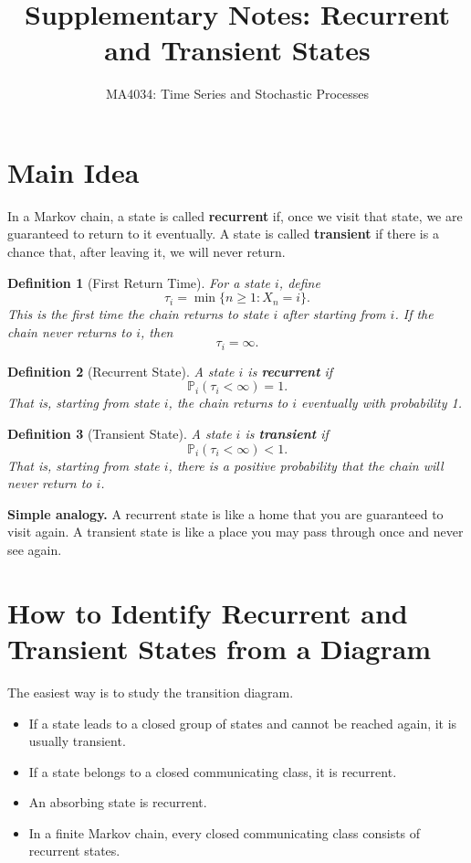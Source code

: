 \documentclass[12pt,a4paper]{article}
\title{\textbf{Supplementary Notes: Recurrent and Transient States}}
\author{MA4034: Time Series and Stochastic Processes}
\date{}
\theoremstyle{notestyle}
\newtheorem{definition}{Definition}
\newcommand{\Prob}{\mathbb{P}}
\begin{document}
\maketitle

\section{Main Idea}

In a Markov chain, a state is called \textbf{recurrent} if, once we visit that state, we are guaranteed to return to it eventually. A state is called \textbf{transient} if there is a chance that, after leaving it, we will never return.

\begin{definition}[First Return Time]
For a state $i$, define
\[
\tau_i=\min\{n\geq 1:X_n=i\}.
\]
This is the first time the chain returns to state $i$ after starting from $i$. If the chain never returns to $i$, then
\[
\tau_i=\infty.
\]
\end{definition}

\begin{definition}[Recurrent State]
A state $i$ is \textbf{recurrent} if
\[
\Prob_i(\tau_i<\infty)=1.
\]
That is, starting from state $i$, the chain returns to $i$ eventually with probability 1.
\end{definition}

\begin{definition}[Transient State]
A state $i$ is \textbf{transient} if
\[
\Prob_i(\tau_i<\infty)<1.
\]
That is, starting from state $i$, there is a positive probability that the chain will never return to $i$.
\end{definition}

\textbf{Simple analogy.} A recurrent state is like a home that you are guaranteed to visit again. A transient state is like a place you may pass through once and never see again.

\section{How to Identify Recurrent and Transient States from a Diagram}

The easiest way is to study the transition diagram.

\begin{itemize}[leftmargin=1.2cm]
    \item If a state leads to a closed group of states and cannot be reached again, it is usually transient.
    \item If a state belongs to a closed communicating class, it is recurrent.
    \item An absorbing state is recurrent.
    \item In a finite Markov chain, every closed communicating class consists of recurrent states.
\end{itemize}
\end{document}
